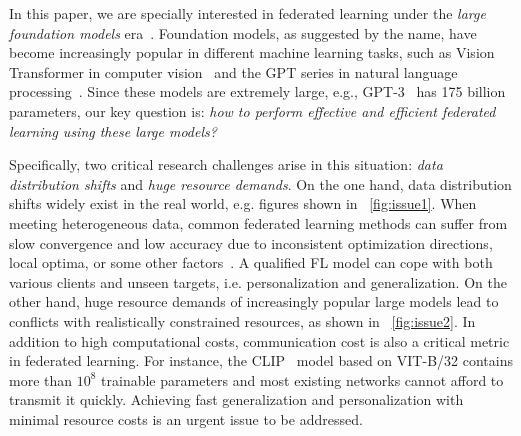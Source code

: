 \documentclass[11pt]{article}
\newcommand{\wjd}[1]{{\color{cyan}{[(WJD): #1]}}}
\begin{document}
In this paper, we are specially interested in federated learning under the \emph{large foundation models} era~\cite{bommasani2021opportunities}.
Foundation models, as suggested by the name, have become increasingly popular in different machine learning tasks, such as Vision Transformer in computer vision~\cite{yuan2021tokens} and the GPT series in natural language processing~\cite{radford2018improving}. %
Since these models are extremely large, e.g., GPT-3~\cite{brown2020language} has 175 billion parameters, our key question is: \emph{how to perform effective and efficient federated learning using these large models?}

Specifically, two critical research challenges arise in this situation: \emph{data distribution shifts} and \emph{huge resource demands}.
On the one hand, data distribution shifts widely exist in the real world, e.g. figures shown in \figurename~\ref{fig:issue1}.
When meeting heterogeneous data, common federated learning methods can suffer from slow convergence and low accuracy due to inconsistent optimization directions, local optima, or some other factors~\cite{gao2022feddc}.
A qualified FL model can cope with both various clients and unseen targets, i.e. personalization and generalization.
On the other hand, huge resource demands of increasingly popular large models lead to conflicts with realistically constrained resources, as shown in \figurename~\ref{fig:issue2}.
In addition to high computational costs, communication cost is also a critical metric in federated learning.
For instance, the CLIP~\cite{radford2021learning} model based on VIT-B/32 contains more than $10^8$ trainable parameters and most existing networks cannot afford to transmit it quickly.
Achieving fast generalization and personalization with minimal resource costs is an urgent issue to be addressed.
\end{document}
